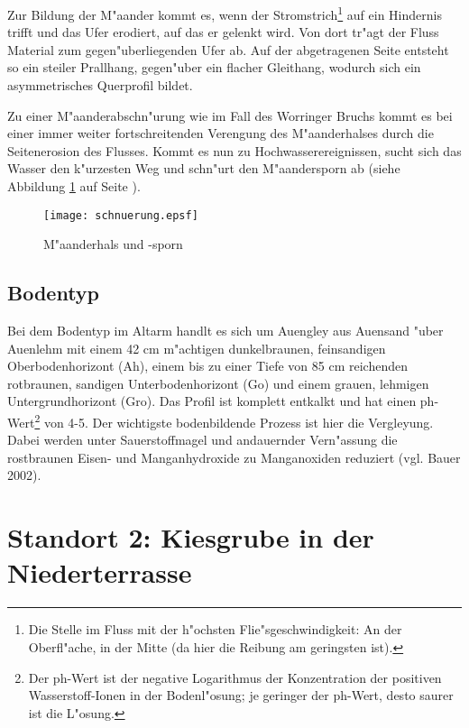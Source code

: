 \documentclass[titlepage,a4paper]{article}
\begin{document}
        Zur Bildung der M"aander kommt es, wenn der Stromstrich\footnote{Die Stelle im Fluss mit der h"ochsten Flie"sgeschwindigkeit: An der Oberfl"ache, in der Mitte (da hier die Reibung am geringsten ist).} auf ein Hindernis trifft und das Ufer erodiert, auf das er gelenkt wird. Von dort tr"agt der Fluss Material zum gegen"uberliegenden Ufer ab. Auf der abgetragenen Seite entsteht so ein steiler Prallhang, gegen"uber ein flacher Gleithang, wodurch sich ein asymmetrisches Querprofil bildet.
        
      Zu einer M"aanderabschn"urung wie im Fall des Worringer Bruchs kommt es bei einer immer weiter fortschreitenden Verengung des M"aanderhalses durch die Seitenerosion des Flusses. Kommt es nun zu Hochwasserereignissen, sucht sich das Wasser den k"urzesten Weg und schn"urt den M"aandersporn ab (siehe Abbildung \ref{schnuerung} auf Seite \pageref{schnuerung}).  

\begin{figure}
\begin{center}
\texttt{[image: schnuerung.epsf]}
\end{center}
\caption{M"aanderhals und -sporn} \label{schnuerung}
\end{figure}

      
    \subsection{Bodentyp}
        
        Bei dem Bodentyp im Altarm handlt es sich um Auengley aus Auensand "uber Auenlehm mit einem 42 cm m"achtigen dunkelbraunen, feinsandigen Oberbodenhorizont (Ah), einem bis zu einer Tiefe von 85 cm reichenden rotbraunen, sandigen Unterbodenhorizont (Go) und einem grauen, lehmigen Untergrundhorizont (Gro). Das Profil ist komplett entkalkt und hat einen ph-Wert\footnote{Der ph-Wert ist der negative Logarithmus der Konzentration der positiven Wasserstoff-Ionen in der Bodenl"osung; je geringer der ph-Wert, desto saurer ist die L"osung.} von 4-5. Der wichtigste bodenbildende Prozess ist hier die Vergleyung. Dabei werden unter Sauerstoffmagel und andauernder Vern"assung die rostbraunen Eisen- und Manganhydroxide zu Manganoxiden reduziert (vgl. Bauer 2002).
                
\section{Standort 2: Kiesgrube in der Niederterrasse}
\end{document}
